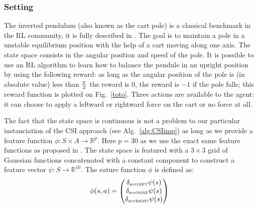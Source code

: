 \documentclass[smallextended]{svjour3}
\begin{document}
\subsubsection{Setting}
The inverted pendulum (also known as the cart pole) is a classical benchmark in the RL community, it is fully described in \cite{lagoudakis2003least}. The goal is to maintain a pole in a unstable equilibrium position with the help of a cart moving along one axis. The state space consists in the angular position and speed of the pole. It is possible to use an RL algorithm to learn how to balance the pendule in an upright position by using the following reward: as long as the angular position of the pole is (in absolute value) less than $\pi \over 2$ the reward is $0$, the reward is $-1$ if the pole falls; this reward function is plotted on Fig.~\ref{toto}. Three actions are available to the agent: it can choose to apply a leftward or rightward force on the cart or no force at all.

The fact that the state space is continuous is not a problem to our particular instanciation of the CSI approach (see Alg.~\ref{alg:CSIimp}) as long as we provide a feature function $\phi: S\times A \rightarrow \mathbb{R}^p$. Here $p=30$ as we use the exact same feature functions as proposed in \cite{lagoudakis2003least}. The state space is featured with a $3\times 3$ grid of Gaussian functions concatenated with a constant component to construct a feature vector $\psi:S \rightarrow \mathbb{R}^{10}$. The eature function $\phi$ is defined as:
\begin{equation}
  \phi(s,a) = \begin{pmatrix}
     \delta_{a = \textsc{left}}\psi(s)\\
     \delta_{a = \textsc{none}}\psi(s)\\
     \delta_{a = \textsc{right}}\psi(s)
  \end{pmatrix}
\end{equation}
\end{document}

